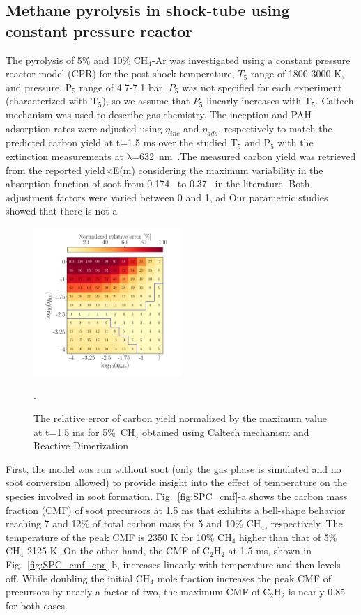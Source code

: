 \subsection{Methane pyrolysis in shock-tube using constant pressure reactor}
The pyrolysis of 5\% and 10\% $\mathrm{CH_4}$-Ar was investigated using a constant pressure reactor model (CPR) for the post-shock temperature, $T_5$ range of 1800-3000 K, and pressure, $\mathrm{P_5}$ range of 4.7-7.1 bar. $P_5$ was not specified for each experiment (characterized with $\mathrm{T_5}$), so we assume that $P_5$ linearly increases with $\mathrm{T_5}$. Caltech mechanism was used to describe gas chemistry. The inception and PAH adsorption rates were adjusted using $\eta_{inc}$ and $\eta_{ads}$, respectively to match the predicted carbon yield at t=1.5 ms over the studied $\mathrm{T_5}$ and $\mathrm{P_5}$ with the extinction measurements at $\mathrm{\lambda}$=632~nm~\citep{agafonov2016unified}.The measured carbon yield was retrieved from the reported yield$\times$E(m) considering the maximum variability in the absorption function of soot from 0.174~\citep{lee1981optical} to 0.37~\citep{agafonov2011soot} in the literature. Both adjustment factors were varied between 0 and 1, ad Our parametric studies showed that there is not a


\begin{figure}[H]
	\centering
	\includegraphics[width=0.5\textwidth]{Figures/Results/Shocktube/Agafonov2016_cpr/5CH4_norm_yield_error_readim.pdf}
	\caption{The relative error of carbon yield normalized by the maximum value at t=1.5 ms for 5\%~$\mathrm{CH_4}$ obtained using Caltech mechanism and Reactive Dimerization}.
	\label{fig:shockagof_yielderror_cpr} 
\end{figure}


First, the model was run without soot (only the gas phase is simulated and no soot conversion allowed) to provide insight into the effect of temperature on the species involved in soot formation. Fig.~\ref{fig:SPC_cmf}-a shows the carbon mass fraction (CMF) of soot precursors at 1.5 ms that exhibits a bell-shape behavior reaching 7 and 12\% of total carbon mass for 5 and 10\% $\mathrm{CH_4}$, respectively. The temperature of the peak CMF is 2350 K for 10\% $\mathrm{CH_4}$ higher than that of 5\% $\mathrm{CH_4}$ 2125 K. On the other hand, the CMF of $\mathrm{C_2H_2}$ at 1.5 ms, shown in Fig.~\ref{fig:SPC_cmf_cpr}-b, increases linearly with temperature and then levels off. While doubling the initial $\mathrm{CH_4}$ mole fraction increases the peak CMF of precursors by nearly a factor of two, the maximum CMF of $\mathrm{C_2H_2}$ is nearly 0.85 for both cases.

